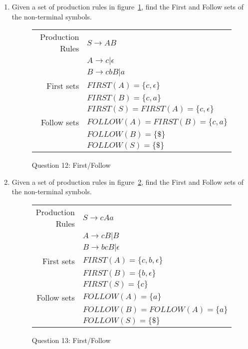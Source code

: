 \documentclass[10pt, oneside, letterpaper]{article}
\begin{document}
\begin{enumerate}
		\item Given a set of production rules in figure~\ref{tab:q12-first-follow}, find the First and Follow sets of the non-terminal symbols.
		
\begin{figure}[!htb]
	\caption{Question 12: First/Follow}
	\label{tab:q12-first-follow}
	\begin{center}
		\begin{tabular}{ r | l }
			Production Rules
			& $S \rightarrow AB$ \\
			& $A \rightarrow c | \epsilon$ \\
			& $B \rightarrow cbB | a$ \\
			\hline
			First sets
			& $FIRST(A) = \{c, \epsilon\}$ \\
			& $FIRST(B) = \{c, a\}$ \\
			& $FIRST(S) = FIRST(A) = \{c, \epsilon\}$ \\
			\hline
			Follow sets
			& $FOLLOW(A) = FIRST(B) = \{c, a\}$ \\
			& $FOLLOW(B) = \{\$\}$ \\
			& $FOLLOW(S) = \{\$\}$
		\end{tabular}
	\end{center}
\end{figure}

		\clearpage
	
		\item Given a set of production rules in figure~\ref{tab:q13-first-follow}, find the First and Follow sets of the non-terminal symbols.

\begin{figure}[!htb]
	\caption{Question 13: First/Follow}
	\label{tab:q13-first-follow}
	\begin{center}
		\begin{tabular}{ r | l }
			Production Rules
			& $S \rightarrow cAa$ \\
			& $A \rightarrow cB | B$ \\
			& $B \rightarrow bcB | \epsilon$ \\
			\hline
			First sets
			& $FIRST(A) = \{c, b, \epsilon\}$ \\
			& $FIRST(B) = \{b, \epsilon\}$ \\
			& $FIRST(S) = \{c\}$ \\
			\hline
			Follow sets
			& $FOLLOW(A) = \{a\}$ \\
			& $FOLLOW(B) = FOLLOW(A) = \{a\}$ \\
			& $FOLLOW(S) = \{\$\}$
		\end{tabular}
	\end{center}
\end{figure}


\end{enumerate}
\end{document}
